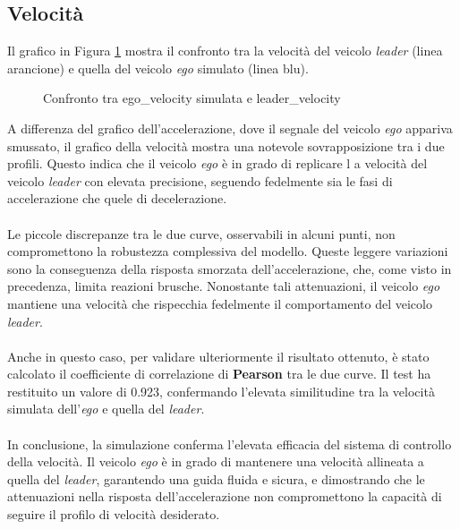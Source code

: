 \subsection{Velocità}
Il grafico in Figura \ref{fig:vel_leader_ego} mostra il confronto tra la velocità del veicolo \emph{leader} 
(linea arancione) e quella del veicolo \emph{ego} simulato (linea blu).
\begin{figure}[H]
    \centering
    \caption{Confronto tra ego\_velocity simulata e leader\_velocity}
    \label{fig:vel_leader_ego}
\end{figure}
\noindent A differenza del grafico dell'accelerazione, dove il segnale del veicolo \emph{ego} appariva smussato, il grafico della 
velocità mostra una notevole sovrapposizione tra i due profili. Questo indica che il veicolo \emph{ego} è in grado di replicare l
a velocità del veicolo \emph{leader} con elevata precisione, seguendo fedelmente sia le fasi di accelerazione che quele di decelerazione.
\\\\
\noindent Le piccole discrepanze tra le due curve, osservabili in alcuni punti, non compromettono la robustezza complessiva del modello. 
Queste leggere variazioni sono la conseguenza della risposta smorzata dell'accelerazione, che, come visto in precedenza, 
limita reazioni brusche. Nonostante tali attenuazioni, il veicolo \emph{ego} mantiene una velocità che rispecchia fedelmente 
il comportamento del veicolo \emph{leader}.
\\\\
\noindent Anche in questo caso, per validare ulteriormente il risultato ottenuto, è stato calcolato il coefficiente di correlazione 
di \textbf{Pearson} tra le due curve. Il test ha restituito un valore di 0.923, confermando l'elevata similitudine tra la 
velocità simulata dell'\emph{ego} e quella del \emph{leader}.
\\\\
\noindent In conclusione, la simulazione conferma l'elevata efficacia del sistema di controllo della velocità. Il veicolo \emph{ego}
è in grado di mantenere una velocità allineata a quella del \emph{leader}, garantendo una guida fluida e sicura, 
e dimostrando che le attenuazioni nella risposta dell'accelerazione non compromettono la capacità di seguire il profilo di velocità 
desiderato.